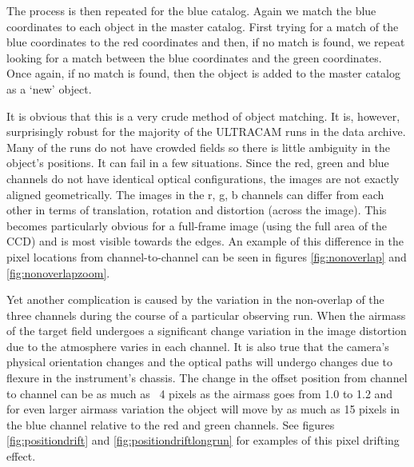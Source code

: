 The process is then repeated for the blue catalog. Again we match the blue coordinates to each object in the master catalog. First trying for a match of the blue coordinates to the red coordinates and then, if no match is found, we repeat looking for a match between the blue coordinates and the green coordinates. Once again, if no match is found, then the object is added to the master catalog as a `new' object.  

It is obvious that this is a very crude method of object matching. It is, however, surprisingly robust for the majority of the ULTRACAM runs in the data archive. Many of the runs do not have crowded fields so there is little ambiguity in the object's positions. It can fail in a few situations. Since the red, green and blue channels do not have identical optical configurations, the images are not exactly aligned geometrically. The images in the r, g, b channels can differ from each other in terms of translation, rotation and distortion (across the image). This becomes particularly obvious for a full-frame image (using the full area of the CCD) and is most visible towards the edges. An example of this difference in the pixel locations from channel-to-channel can be seen in figures \ref{fig:nonoverlap} and \ref{fig:nonoverlapzoom}.

Yet another complication is caused by the variation in the non-overlap of the three channels during the course of a particular observing run. When the airmass of the target field undergoes a significant change variation in the image distortion due to the atmosphere varies in each channel. It is also true that the camera's physical orientation changes and the optical paths will undergo changes due to flexure in the instrument's chassis. The change in the offset position from channel to channel can be as much as ~4 pixels as the airmass goes from 1.0 to 1.2 and for even larger airmass variation the object will move by as much as 15 pixels in the blue channel relative to the red and green channels. See figures \ref{fig:positiondrift} and \ref{fig:positiondriftlongrun} for examples of this pixel drifting effect. 

